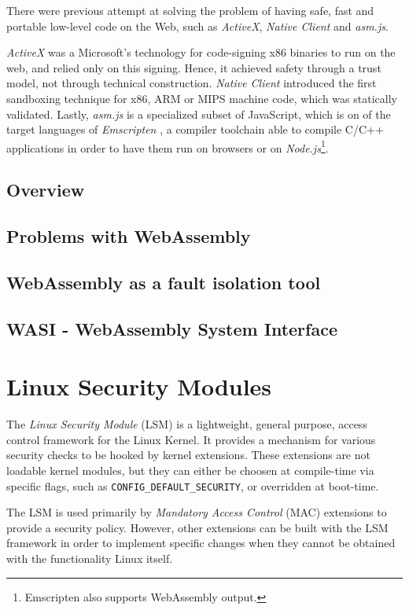 There were previous attempt at solving the problem of having safe, fast and portable low-level code on the Web,
such as \textit{ActiveX}, \textit{Native Client} and \textit{asm.js}.

\textit{ActiveX} \cite{activex} was a Microsoft's technology for code-signing x86 binaries to run on the web, and relied only
on this signing. Hence, it achieved safety through a trust model, not through technical construction.
\textit{Native Client} \cite{native-client} introduced the first sandboxing technique for x86, ARM or MIPS machine code,
which was statically validated. Lastly, \textit{asm.js} \cite{asmjs} is a specialized subset of JavaScript, which is on of the target
languages of \textit{Emscripten} \cite{emscripten}, a compiler toolchain able to compile C/C++ applications in order to have them
run on browsers or on \textit{Node.js}\footnote{ Emscripten also supports WebAssembly output.}.

\subsection{Overview}

\subsection{Problems with WebAssembly}
\subsection{WebAssembly as a fault isolation tool}
\subsection{WASI - WebAssembly System Interface}

\section{Linux Security Modules}

The \textit{Linux Security Module} (LSM) \cite{lsm-2002} \cite{kernel-lsm}
is a lightweight, general purpose, access control framework for the Linux Kernel.
It provides a mechanism for various security checks to be hooked by kernel extensions.
These extensions are not loadable kernel modules, but they can either be choosen at
compile-time via specific flags, such as \texttt{CONFIG\_DEFAULT\_SECURITY}, or overridden at boot-time.

The LSM is used primarily by \textit{Mandatory Access Control} (MAC) extensions to
provide a security policy. However, other extensions can be built with the LSM framework
in order to implement specific changes when they cannot be obtained with the functionality Linux itself.

